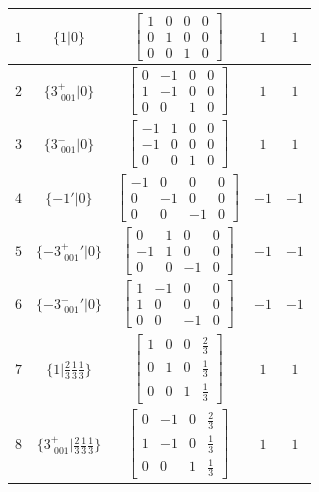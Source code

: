 \documentclass[fleqn,8pt]{jsarticle}
\begin{document}
\begin{longtable}{ccccc}
$ 1 $ & $ \{1|0\} $ & $ \begin{bmatrix} 1 & 0 & 0 & 0 \\ 0 & 1 & 0 & 0 \\ 0 & 0 & 1 & 0 \end{bmatrix} $ & $ 1 $ & $ 1 $ \\ \hline
$ 2 $ & $ \{3^{+}_{\,\,001}|0\} $ & $ \begin{bmatrix} 0 & -1 & 0 & 0 \\ 1 & -1 & 0 & 0 \\ 0 & 0 & 1 & 0 \end{bmatrix} $ & $ 1 $ & $ 1 $ \\ \hline
$ 3 $ & $ \{3^{-}_{\,\,001}|0\} $ & $ \begin{bmatrix} -1 & 1 & 0 & 0 \\ -1 & 0 & 0 & 0 \\ 0 & 0 & 1 & 0 \end{bmatrix} $ & $ 1 $ & $ 1 $ \\ \hline
$ 4 $ & $ \{-1{}'|0\} $ & $ \begin{bmatrix} -1 & 0 & 0 & 0 \\ 0 & -1 & 0 & 0 \\ 0 & 0 & -1 & 0 \end{bmatrix} $ & $ -1 $ & $ -1 $ \\ \hline
$ 5 $ & $ \{-3^{+}_{\,\,001}{}'|0\} $ & $ \begin{bmatrix} 0 & 1 & 0 & 0 \\ -1 & 1 & 0 & 0 \\ 0 & 0 & -1 & 0 \end{bmatrix} $ & $ -1 $ & $ -1 $ \\ \hline
$ 6 $ & $ \{-3^{-}_{\,\,001}{}'|0\} $ & $ \begin{bmatrix} 1 & -1 & 0 & 0 \\ 1 & 0 & 0 & 0 \\ 0 & 0 & -1 & 0 \end{bmatrix} $ & $ -1 $ & $ -1 $ \\ \hline
$ 7 $ & $ \{1|\frac{2}{3} \frac{1}{3} \frac{1}{3}\} $ & $ \begin{bmatrix} 1 & 0 & 0 & \frac{2}{3} \\ 0 & 1 & 0 & \frac{1}{3} \\ 0 & 0 & 1 & \frac{1}{3} \end{bmatrix} $ & $ 1 $ & $ 1 $ \\ \hline
$ 8 $ & $ \{3^{+}_{\,\,001}|\frac{2}{3} \frac{1}{3} \frac{1}{3}\} $ & $ \begin{bmatrix} 0 & -1 & 0 & \frac{2}{3} \\ 1 & -1 & 0 & \frac{1}{3} \\ 0 & 0 & 1 & \frac{1}{3} \end{bmatrix} $ & $ 1 $ & $ 1 $ \\ \hline

\end{longtable}
\end{document}
